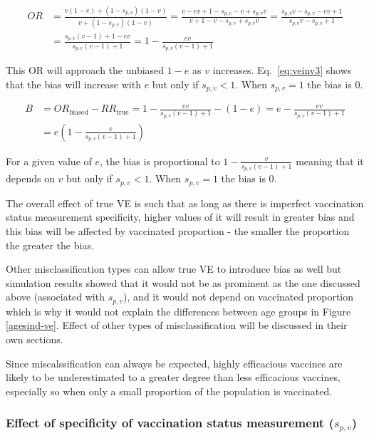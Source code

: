 \documentclass[11pt]{article}
\begin{document}
\begin{equation} \label{eq:veinv2}
\begin{aligned}
OR &= \frac{v(1-e)+(1-s_{p,v})(1-v)}{v+(1-s_{p,v})(1-v)} =  \frac{v-ev+1-s_{p,v}-v+s_{p,v}v}{v+1-v-s_{p,v}+s_{p,v}v} =  
	\frac{s_{p,v}v-s_{p,v}-ev+1}{s_{p,v}v-s_{p,v}+1} \\
	&= \frac{s_{p,v}(v-1)+1-ev}{s_{p,v}(v-1)+1} = 1 - \frac{ev}{s_{p,v}(v-1)+1}
\end{aligned}
\end{equation}

This OR will approach the unbiased $1-e$ as $v$ increases. Eq.\ \ref{eq:veinv3} shows that the bias will increase with $e$ but only if $s_{p,v}<1$. When $s_{p,v}=1$ the bias is 0.

\begin{equation} \label{eq:veinv3}
\begin{aligned}
B &= OR_{\text{biased}} - RR_{\text{true}} = 1 - \frac{ev}{s_{p,v}(v-1)+1} - (1-e) = e - \frac{ev}{s_{p,v}(v-1)+1} \\
	&= e(1 - \frac{v}{s_{p,v}(v-1)+1})
\end{aligned}
\end{equation}

For a given value of $e$, the bias is proportional to $1 - \frac{v}{s_{p,v}(v-1)+1}$ meaning that it depends on $v$ but only if $s_{p,v}<1$. When $s_{p,v}=1$ the bias is 0.

The overall effect of true VE is such that as long as there is imperfect vaccination status measurement specificity, higher values of it will result in greater bias and this bias will be affected by vaccinated proportion - the smaller the proportion the greater the bias. 

Other misclassification types can allow true VE to introduce bias as well but simulation results showed that it would not be as prominent as the one discussed above (associated with $s_{p,v}$), and it would not depend on vaccinated proportion which is why it would not explain the differences between age groups in Figure \ref{agesind-ve}. Effect of other types of misclassification will be discussed in their own sections.

Since miscalssification can always be expected, highly efficacious vaccines are likely to be underestimated to a greater degree than less efficacious vaccines, especially so when only a small proportion of the population is vaccinated.

\subsubsection{Effect of specificity of vaccination status measurement ($s_{p,v}$)}
\end{document}

